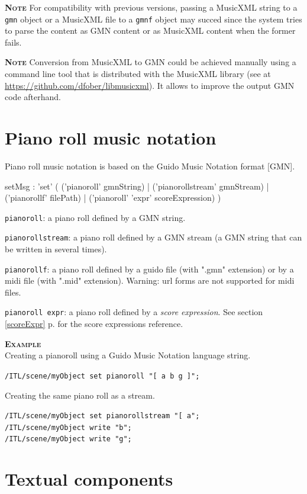 \documentclass[a4paper,twoside]{report}
\newcommand{\sublevel}[1]	{\section{#1}}
\newcommand{\fullref}[1]	{\ref{#1} p.\pageref{#1}}
\newcommand{\OSC}[1]		{\texttt{#1}}
\newcommand{\example}		{\textbf{\hspace{-1.5cm}\textbf{\textsc{Example }}}}
\newcommand{\note}	[1]		{\vspace{2mm}\textbf{\hspace{-0.9cm}\textbf{\textsc{Note #1}}}}
\let\olditemize\itemize
\let\oldenditemize\enditemize
\renewenvironment{itemize} 	{\olditemize \setlength{\itemsep}{1mm}}{\oldenditemize}
\newcommand{\sample}	[1]			{\vspace{-2mm}\begin{center}\colorbox{mygrey}{
								\begin{minipage}[t]{0.9\columnwidth} 
								{\small \texttt{#1}}
								\end{minipage}}\end{center}}
\begin{document}
\note{} For compatibility with previous versions, passing a MusicXML string to a \OSC{gmn} object or a MusicXML file to a \OSC{gmnf} object may succed since the system tries to parse the content as GMN content or as MusicXML content when the former fails.

\note{} Conversion from MusicXML to GMN could be achieved manually using a command line tool that is distributed with the MusicXML library (see at \url{https://github.com/dfober/libmusicxml}). It allows to improve the output GMN code afterhand.

\sublevel{Piano roll music notation}
\label{pianorollscore}
Piano roll music notation is based on the Guido Music Notation format [GMN].

\begin{rail}
setMsg : 'set' (
	('pianoroll' gmnString) |
	('pianorollstream' gmnStream) |
	('pianorollf' filePath) |
	('pianoroll' 'expr' scoreExpression)
)
\end{rail}

\begin{itemize}
\item \OSC{pianoroll}: a piano roll defined by a GMN string.
\item \OSC{pianorollstream}: a piano roll defined by a GMN stream (a GMN string that can be written in several times).
\item \OSC{pianorollf}: a piano roll defined by a guido file (with ".gmn" extension) or by a midi file (with ".mid" extension). Warning: url forms are not supported for midi files.
\item \OSC{pianoroll expr}: a piano roll defined by a \emph{score expression}. See section \fullref{scoreExpr} for the score expressions reference.
\end{itemize}

\example \\
Creating a pianoroll using a Guido Music Notation language string.
\sample{/ITL/scene/myObject set pianoroll "[ a b g ]";}
Creating the same piano roll as a stream.
\sample{/ITL/scene/myObject set pianorollstream "[ a";\\
/ITL/scene/myObject write "b";\\
/ITL/scene/myObject write "g";
}

\sublevel{Textual components}
\label{textscore}
\end{document}
